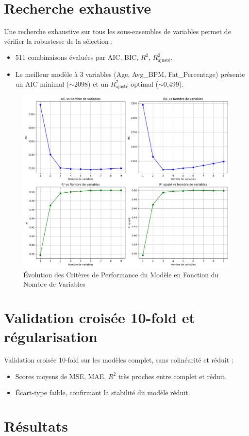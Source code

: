 \documentclass[12pt,a4paper]{article}
\begin{document}
\section{Recherche exhaustive}
Une recherche exhaustive sur tous les sous-ensembles de variables permet de vérifier la robustesse de la sélection :
\begin{itemize}
\item 511 combinaisons évaluées par AIC, BIC, $R^2$, $R^2_{\text{ajusté}}$.
\item Le meilleur modèle à 3 variables (Age, Avg\_BPM, Fat\_Percentage) présente un AIC minimal ($\sim$2098) et un $R^2_{\text{ajusté}}$ optimal ($\sim$0,499).
\end{itemize}

\begin{figure}[H]
  \centering
  \includegraphics[width=0.7\linewidth]{information_criterion.png}
  \caption{Évolution des Critères de Performance du Modèle en Fonction du Nombre de Variables}
\end{figure}

\section{Validation croisée 10-fold et régularisation}

Validation croisée 10-fold sur les modèles complet, sans colinéarité et réduit :
\begin{itemize}
\item Scores moyens de MSE, MAE, $R^2$ très proches entre complet et réduit.
\item Écart-type faible, confirmant la stabilité du modèle réduit.
\end{itemize}

\section{Résultats}
\end{document}
